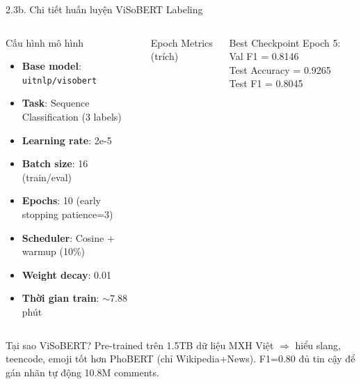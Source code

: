 \documentclass[11pt, aspectratio=169]{beamer}
\begin{document}
\begin{frame}[shrink=8]{2.3b. Chi tiết huấn luyện ViSoBERT Labeling}

\begin{columns}[T]
  \begin{block}{Cấu hình mô hình}
    \begin{itemize}
      \item \textbf{Base model}: \texttt{uitnlp/visobert}
      \item \textbf{Task}: Sequence Classification (3 labels)
      \item \textbf{Learning rate}: 2e-5
      \item \textbf{Batch size}: 16 (train/eval)
      \item \textbf{Epochs}: 10 (early stopping patience=3)
      \item \textbf{Scheduler}: Cosine + warmup (10\%)
      \item \textbf{Weight decay}: 0.01
      \item \textbf{Thời gian train}: $\sim$7.88 phút
    \end{itemize}
  \end{block}

  \begin{block}{Epoch Metrics (trích)}
    \centering
  \end{block}
  \vspace{0.2cm}
  \begin{block}{Best Checkpoint}
    Epoch 5: Val F1 = 0.8146\\
    Test Accuracy = 0.9265\\
    Test F1 = 0.8045
  \end{block}
\end{columns}

\vspace{0.2cm}
\begin{block}{Tại sao ViSoBERT?}
  Pre-trained trên 1.5TB dữ liệu MXH Việt $\Rightarrow$ hiểu slang, teencode, emoji tốt hơn PhoBERT (chỉ Wikipedia+News). F1=0.80 đủ tin cậy để gán nhãn tự động 10.8M comments.
\end{block}
\end{frame}
\end{document}
